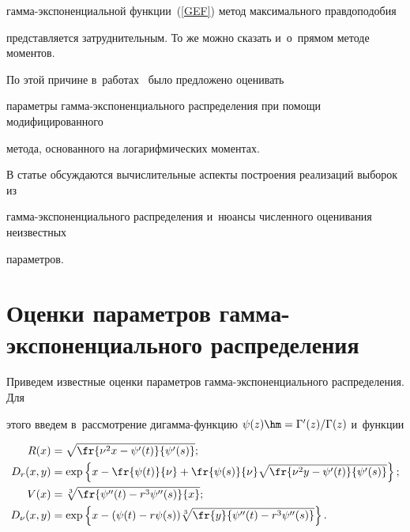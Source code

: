 гам\-ма-экс\-по\-нен\-ци\-аль\-ной функции~(\ref{GEF}) метод максимального прав\-до\-по\-до\-бия 


пред\-став\-ля\-ет\-ся затруднительным. То же можно сказать и~о~прямом методе моментов. 


По этой причине в~работах~\cite{KuShe2020,KuShe2021} было предложено оценивать 


параметры гам\-ма-экс\-по\-нен\-ци\-аль\-но\-го распределения при помощи модифицированного 


метода, основанного на логарифмических моментах.





В статье обсуждаются вычислительные аспекты по\-стро\-ения реализаций выборок из 


гам\-ма-экс\-по\-нен\-ци\-аль\-но\-го распределения и~нюансы численного оценивания неизвестных 


па\-ра\-мет\-ров.








\section{Оценки параметров гамма-экспоненциального распределения}





Приведем известные оценки параметров гамма-экс\-по\-нен\-ци\-аль\-но\-го распределения. Для 


этого введем в~рас\-смот\-ре\-ние ди\-гам\-ма-функ\-цию $ \psi(z)\hm={\Gamma'(z)}/{\Gamma(z)}$ и~функции


\begin{align}


\label{R}


R(x)&=


\sqrt{\fr{\nu^2x-{\psi'(t)}}{\psi'(s)}};


\\




D_r(x,y)&=


\exp\left\{


x-\fr{\psi(t)}{\nu}+\fr{\psi(s)}{\nu}\sqrt{\fr{\nu^2y-{\psi'(t)}}{\psi'(s)}}


\right\};\notag


\\


\label{V}


V(x)&=\sqrt[3]{\fr{\psi''(t)-r^3\psi''(s)}{x}};


\\




D_\nu(x,y)&=


\exp\left\{x-(\psi(t)-r\psi(s))


\sqrt[3]{\fr{y}{\psi''(t)-r^3\psi''(s)}}\right\}.\notag


\end{align}








